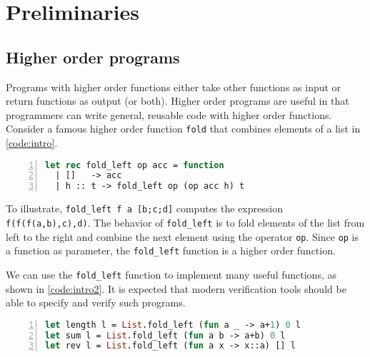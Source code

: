 
\chapter{Preliminaries}
\label{ch:preliminaries}
\vspace{2em}

\section{Higher order programs}

Programs with higher order functions either take other functions as input or return functions as output (or both). Higher order programs are useful in that programmers can write general, reusable code with higher order functions. Consider a famous higher order function \texttt{fold} that combines elements of a list in \autoref{code:intro}.

\begin{lstlisting}[language=Caml, mathescape=true, xleftmargin=2em, aboveskip=1em, xrightmargin=1em, numbers=left, frame = {TB}, caption=Higher order function that combines list elements, label=code:intro]
let rec fold_left op acc = function
  | []   -> acc
  | h :: t -> fold_left op (op acc h) t
\end{lstlisting}

To illustrate, \texttt{fold\_left f a [b;c;d]} computes the expression
\texttt{f(f(f(a,b),c),d)}. The behavior of \texttt{fold\_left} is to 
fold elements of the list from left to the right and combine the next
element using the operator \texttt{op}. Since \texttt{op} is a 
function as parameter, the \texttt{fold\_left} function is a higher
order function.

We can use the \texttt{fold\_left} function to implement many useful functions, as shown in \autoref{code:intro2}. It is expected that modern verification tools should be able to specify and verify such programs.

\begin{lstlisting}[language=Caml, mathescape=true, xleftmargin=2em, aboveskip=1em, xrightmargin=1em, numbers=left, frame = {TB}, caption=\texttt{fold\_left} application examples, label=code:intro2]
let length l = List.fold_left (fun a _ -> a+1) 0 l
let sum l = List.fold_left (fun a b -> a+b) 0 l
let rev l = List.fold_left (fun a x -> x::a) [] l
\end{lstlisting}



